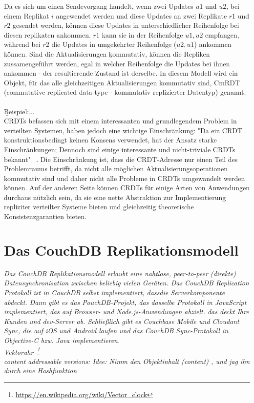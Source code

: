   Da es sich um einen Sendevorgang handelt, wenn zwei Updates $u1$ und $u2$, bei einem Replikat $i$ angewendet werden und diese Updates an zwei Replikate $r1$ und $r2$ gesendet werden, können diese Updates in unterschiedlicher Reihenfolge bei diesen replikaten ankommen. $r1$ kann sie in der Reihenfolge $u1, u2$ empfangen, während bei $r2$ die Updates in umgekehrter Reihenfolge ($u2, u1$) ankommen können. Sind die Aktualisierungen \b{kommutativ}, können die Repliken zussamengeführt werden, egal in welcher Reihenfolge die Updates bei ihnen ankommen - der resultierende Zustand ist derselbe. In diesem Modell wird ein Objekt, für das alle gleichzeitigen Aktualisierungen kommutativ sind, CmRDT (commutative replicated data type - kommutativ replizierter Datentyp) genannt. \\\\
  \b{Beispiel:...}\\
  CRDTs befassen sich mit einem interessanten und grundlegendem Problem in verteilten Systemen, haben jedoch eine wichtige Einschränkung: "Da ein CRDT konstruktionsbedingt keinen Konsens verwendet, hat der Ansatz starke Einschränkungen; Dennoch sind einige interessante und nicht-triviale CRDTs bekannt" ~\cite{crdt_shapiro2}. Die Einschränkung ist, dass die CRDT-Adresse nur einen Teil des Problemraums betrifft, da nicht alle möglichen Aktualisierungsoperationen kommutativ sind und daher nicht alle Probleme in CRDTs umgewandelt werden können. Auf der anderen Seite können CRDTs für einige Arten von Anwendungen durchaus nützlich sein, da sie eine nette Abstraktion zur Implementierung repliziter verteilter Systeme bieten und gleichzeitig theoretische Konsistenzgarantien bieten.
%
%
  \section{Das CouchDB Replikationsmodell}
  \it{Das CouchDB Replikationsmodell erlaubt eine nahtlose, peer-to-peer (direkte) Datensynchronisation zwischen beliebig vielen Geräten. Das CouchDB Replication Protokoll ist in CouchDB selbst implementiert, dassdie Serverkomponente abdeckt. Dann gibt es das PouchDB-Projekt, das dasselbe Protokoll in JavaScript implementiert, das auf Browser- und Node.js-Anwendungen abzielt. das deckt Ihre Kunden und dev-Server ab. Schließlich gibt es Couchbase Mobile und Cloudant Sync, die auf iOS und Android laufen und das CouchDB Sync-Protokoll in Objective-C bzw. Java implementieren.}\\
  Vektoruhr~\footnote{\url{https://en.wikipedia.org/wiki/Vector_clock}} \\
  content addressable versions: Idee: Nimm den Objektinhalt (content) ,  und jag ihn durch eine \gls{Hashfunktion}\\
%
%


